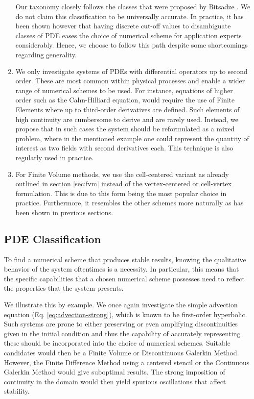 \documentclass[asi,article,submit,moreauthors]{Definitions/mdpi}
\begin{document}
\begin{enumerate}
    Our taxonomy closely follows the classes that were proposed by Bitsadze \cite{bitsadze1988some}.
    We do not claim this classification to be universally accurate.
    In practice, it has been shown however that having discrete cut-off values to disambiguate classes of PDE eases the choice of numerical scheme for application experts considerably.
    Hence, we choose to follow this path despite some shortcomings regarding generality.
    \item We only investigate systems of PDEs with differential operators up to second order.
    These are most common within physical processes and enable a wider range of numerical schemes to be used.
    For instance, equations of higher order such as the Cahn-Hilliard equation, would require the use of Finite Elements where up to third-order derivatives are defined.
    Such elements of high continuity are cumbersome to derive and are rarely used.
    Instead, we propose that in such cases the system should be reformulated as a mixed problem, where in the mentioned example one could represent the quantity of interest as two fields with second derivatives each.
    This technique is also regularly used in practice.
    \item For Finite Volume methods, we use the cell-centered variant as already outlined in section \ref{sec:fvm} instead of the vertex-centered or cell-vertex formulation.
    This is due to this form being the most popular choice in practice.
    Furthermore, it resembles the other schemes more naturally as has been shown in previous sections.
\end{enumerate}

\subsection{PDE Classification}\label{sec:pde-classification}

To find a numerical scheme that produces stable results, knowing the qualitative behavior of the system oftentimes is a necessity.
In particular, this means that the specific capabilities that a chosen numerical scheme possesses need to reflect the properties that the system presents.

We illustrate this by example. We once again investigate the simple advection equation (Eq. \ref{eq:advection-strong}), which is known to be first-order hyperbolic.
Such systems are prone to either preserving or even amplifying discontinuities given in the initial condition and thus the capability of accurately representing these should be incorporated into the choice of numerical schemes.
Suitable candidates would then be a Finite Volume or Discontinuous Galerkin Method.
However, the Finite Difference Method using a centered stencil or the Continuous Galerkin Method would give suboptimal results. The strong imposition of continuity in the domain would then yield spurious oscillations that affect stability.
\end{document}
